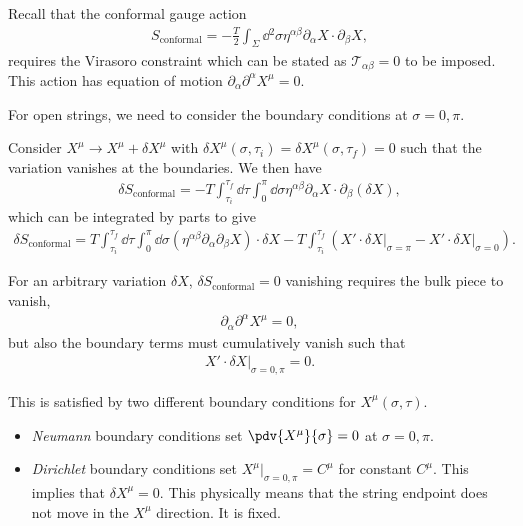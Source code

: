 
Recall that the conformal gauge action
\begin{align}
    S_\text{conformal} = -\frac{T}{2} \int_\Sigma \dd{^2\sigma} \eta^{\alpha \beta} \partial_\alpha X \cdot  \partial_\beta X
,\end{align}
requires the Virasoro constraint which can be stated as $\mathcal{T}_{\alpha \beta} = 0$ to be imposed. This action has equation of motion $\partial_\alpha \partial^{\alpha} X^{\mu} = 0$.

For open strings, we need to consider the boundary conditions at $\sigma = 0, \pi$.

Consider $X^{\mu} \to X^{\mu} + \delta X^{\mu}$ with $\delta X^{\mu} \left( \sigma, \tau_i \right) = \delta X^{\mu} \left( \sigma, \tau_f \right) = 0$ such that the variation vanishes at the boundaries. We then have
\begin{align}
    \delta S_\text{conformal} = -T \int_{\tau_i}^{\tau_f} \dd{\tau} \int_0^{\pi} \dd{\sigma} \eta^{\alpha \beta} \partial_\alpha X \cdot \partial_\beta \left( \delta X \right) 
,\end{align}
which can be integrated by parts to give
\begin{align}
    \delta S_\text{conformal} = T \int_{\tau_i}^{\tau_f} \dd{\tau} \int_0^{\pi} \dd{\sigma} \left( \eta^{\alpha \beta} \partial_\alpha \partial_\beta X \right) \cdot \delta X - T \int_{\tau_i}^{\tau_f} \left( X' \cdot \delta X \bigg|_{\sigma = \pi} - X' \cdot \delta X \bigg|_{\sigma = 0} \right) 
.\end{align}

For an arbitrary variation $\delta X$, $\delta S_\text{conformal} = 0$ vanishing requires the bulk piece to vanish,
\begin{align}
    \partial_\alpha \partial^{\alpha} X^{\mu} = 0
,\end{align}
but also the boundary terms must cumulatively vanish such that
\begin{align}
    X' \cdot \delta X \bigg|_{\sigma = 0, \pi} = 0
.\end{align}

This is satisfied by two different boundary conditions for $X^{\mu} \left( \sigma, \tau \right) $.
\begin{itemize}
    \item \emph{Neumann} boundary conditions set $\pdv{X^{\mu}}{\sigma} = 0$ at $\sigma = 0, \pi$.
    \item \emph{Dirichlet} boundary conditions set $X^{\mu} \bigg|_{\sigma = 0, \pi} = C^{\mu}$ for constant $C^{\mu}$. This implies that $\delta X^{\mu} = 0$. This physically means that the string endpoint does not move in the $X^{\mu}$ direction. It is fixed.
\end{itemize}

